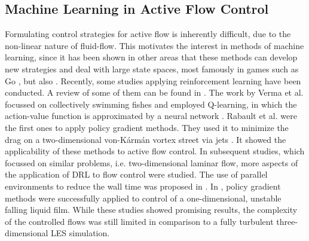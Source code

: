 \subsection{Machine Learning in Active Flow Control}
Formulating control strategies for active flow is inherently difficult, due to the non-linear nature of fluid-flow. This motivates the interest in methods of machine learning, since it has been shown in other areas that these methods can develop new strategies and deal with large state spaces, most famously in games such as Go \cite{silver_mastering_2017}, but also . Recently, some studies applying reinforcement learning have been conducted. A review of some of them can be found in \cite{garnier_review_2019}. The work by Verma et al. focussed on collectively swimming fishes and employed Q-learning, in which the action-value function is approximated by a neural network \cite{verma_efficient_2018}. Rabault et al. were the first ones to apply policy gradient methods. They used it to minimize the drag on a two-dimensional von-K\'arm\'an vortex street via jets \cite{rabault_deep_2018}. It showed the applicability of these methods to active flow control. In subsequent studies, which focussed on similar problems, i.e. two-dimensional laminar flow, more aspects of the application of DRL to flow control were studied. The use of parallel environments to reduce the wall time was proposed in \cite{rabault_accelerating_2019}. In \cite{belus_exploiting_2019}, policy gradient methods were successfully applied to control of a one-dimensional, unstable falling liquid film. While these studies showed promising results, the complexity of the controlled flows was still limited in comparison to a fully turbulent three-dimensional LES simulation.
